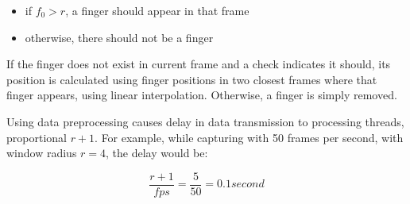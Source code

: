 \begin{itemize}
\item if $f_0 > r$, a finger should appear in that frame
\item otherwise, there should not be a finger
\end{itemize}

If the finger does not exist in current frame and a check indicates it should, its position is calculated using finger positions in two closest frames where that finger appears, using linear interpolation. Otherwise, a finger is simply removed.

Using data preprocessing causes delay in data transmission to processing threads, proportional $r+1$. For example, while capturing with 50 frames per second, with window radius $r=4$, the delay would be:

$$ \frac{r+1}{fps} = \frac{5}{50} = 0.1 second $$